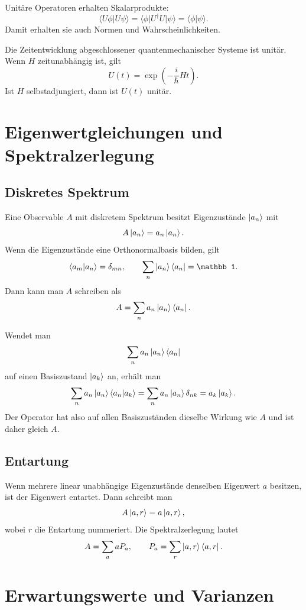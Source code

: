 Unitäre Operatoren erhalten Skalarprodukte:
\[
    \langle U\phi|U\psi\rangle
    =\langle\phi|U^\dagger U|\psi\rangle
    =\langle\phi|\psi\rangle.
\]
Damit erhalten sie auch Normen und Wahrscheinlichkeiten.

\begin{notebox}
Die Zeitentwicklung abgeschlossener quantenmechanischer Systeme ist unitär. Wenn $H$ zeitunabhängig ist, gilt
\[
    U(t)=\exp\left(-\frac{i}{\hbar}Ht\right).
\]
Ist $H$ selbstadjungiert, dann ist $U(t)$ unitär.
\end{notebox}

\section{Eigenwertgleichungen und Spektralzerlegung}

\subsection{Diskretes Spektrum}

Eine Observable $A$ mit diskretem Spektrum besitzt Eigenzustände $\left|a_n\right\rangle$ mit
\[
    A\left|a_n\right\rangle=a_n\left|a_n\right\rangle.
\]
Wenn die Eigenzustände eine Orthonormalbasis bilden, gilt
\[
    \langle a_m|a_n\rangle=\delta_{mn},
    \qquad
    \sum_n\ket{a_n}\bra{a_n}=\mathbb 1.
\]
Dann kann man $A$ schreiben als
\[
    A=\sum_n a_n\left|a_n\right\rangle\left\langle a_n\right|.
\]

\begin{derivationbox}
Wendet man
\[
    \sum_n a_n\left|a_n\right\rangle\left\langle a_n\right|
\]
auf einen Basiszustand $\left|a_k\right\rangle$ an, erhält man
\[
    \sum_n a_n\left|a_n\right\rangle\langle a_n|a_k\rangle
    =\sum_n a_n\left|a_n\right\rangle\delta_{nk}
    =a_k\left|a_k\right\rangle.
\]
Der Operator hat also auf allen Basiszuständen dieselbe Wirkung wie $A$ und ist daher gleich $A$.
\end{derivationbox}

\subsection{Entartung}

Wenn mehrere linear unabhängige Eigenzustände denselben Eigenwert $a$ besitzen, ist der Eigenwert entartet. Dann schreibt man
\[
    A\left|a,r\right\rangle=a\left|a,r\right\rangle,
\]
wobei $r$ die Entartung nummeriert. Die Spektralzerlegung lautet
\[
    A=\sum_a aP_a,
    \qquad
    P_a=\sum_r\left|a,r\right\rangle\left\langle a,r\right|.
\]

\section{Erwartungswerte und Varianzen}

